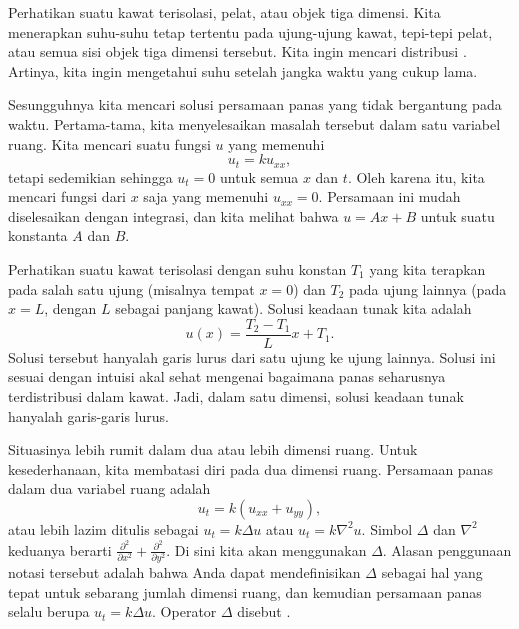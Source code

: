 
Perhatikan suatu kawat terisolasi, pelat, atau objek tiga dimensi.
Kita menerapkan
suhu-suhu tetap tertentu pada ujung-ujung kawat, tepi-tepi pelat,
atau semua sisi objek tiga dimensi tersebut.  Kita ingin mencari distribusi
\emph{}.
Artinya, kita ingin mengetahui
suhu setelah jangka waktu yang cukup lama.

Sesungguhnya kita mencari solusi persamaan panas yang tidak
bergantung pada waktu.
Pertama-tama, kita menyelesaikan masalah tersebut dalam satu variabel ruang.
Kita mencari suatu fungsi $u$ yang memenuhi
\begin{equation*}
u_t = k u_{xx} ,
\end{equation*}
tetapi sedemikian sehingga $u_t = 0$ untuk semua $x$ dan $t$.  Oleh karena itu, kita mencari
fungsi dari $x$ saja yang memenuhi $u_{xx} = 0$.  Persamaan ini mudah diselesaikan
dengan integrasi,
dan kita melihat bahwa $u = Ax+B$ untuk suatu konstanta $A$ dan $B$.

Perhatikan suatu kawat terisolasi dengan suhu konstan $T_1$ yang kita terapkan
pada salah satu ujung (misalnya tempat $x=0$) dan $T_2$ pada ujung lainnya (pada $x=L$, dengan $L$
sebagai panjang kawat).  Solusi keadaan tunak kita adalah
\begin{equation*}
u(x) = \frac{T_2-T_1}{L} x + T_1 .
\end{equation*}
Solusi tersebut hanyalah garis lurus dari satu ujung ke ujung lainnya.
Solusi ini sesuai dengan intuisi
akal sehat mengenai bagaimana panas seharusnya
terdistribusi dalam kawat.  Jadi, dalam satu dimensi, solusi keadaan tunak
hanyalah garis-garis lurus.

Situasinya lebih rumit dalam dua atau lebih dimensi ruang.
Untuk kesederhanaan, kita membatasi diri pada dua dimensi ruang.
Persamaan panas dalam dua
variabel ruang adalah
\begin{equation} \label{dirich:heateq}
u_t = k(u_{xx} + u_{yy}) ,
\end{equation}
atau lebih lazim ditulis sebagai
$u_t = k \Delta u$ atau
$u_t = k \nabla^2 u$.  Simbol $\Delta$ dan $\nabla^2$
keduanya berarti $\frac{\partial^2}{\partial x^2} +
\frac{\partial^2}{\partial y^2}$.  Di sini kita akan menggunakan $\Delta$.
Alasan penggunaan notasi tersebut adalah bahwa Anda
dapat mendefinisikan $\Delta$ sebagai hal yang tepat untuk sebarang jumlah dimensi
ruang, dan kemudian persamaan panas selalu berupa
$u_t = k \Delta u$.  Operator $\Delta$ disebut \emph{}.

